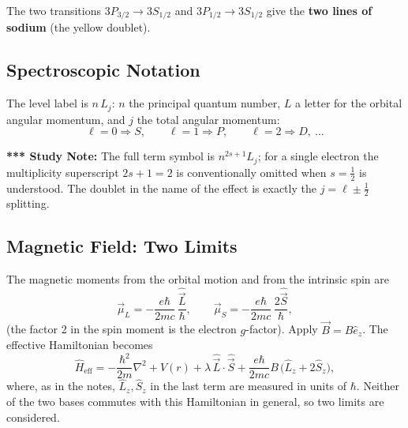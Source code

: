 \documentclass[11pt,a4paper]{article}
\begin{document}
\begin{center}
\end{center}
The two transitions $3P_{3/2}\to3S_{1/2}$ and $3P_{1/2}\to3S_{1/2}$ give the \textbf{two lines of sodium} (the yellow doublet).

\subsection{Spectroscopic Notation}
The level label is $n\,L_j$: $n$ the principal quantum number, $L$ a letter for the orbital angular momentum, and $j$ the total angular momentum:
\[
\ell=0\Rightarrow S,\qquad \ell=1\Rightarrow P,\qquad \ell=2\Rightarrow D,\ \dots
\]

\textbf{*** Study Note:} The full term symbol is $n^{2s+1}L_j$; for a single electron the multiplicity superscript $2s+1=2$ is conventionally omitted when $s=\tfrac12$ is understood. The doublet in the name of the effect is exactly the $j=\ell\pm\tfrac12$ splitting.

\subsection{Magnetic Field: Two Limits}
The magnetic moments from the orbital motion and from the intrinsic spin are
\[
\vec\mu_L=-\frac{e\hbar}{2mc}\,\frac{\hat{\vec L}}\hbar,\qquad \vec\mu_S=-\frac{e\hbar}{2mc}\,\frac{2\hat{\vec S}}\hbar ,
\]
(the factor 2 in the spin moment is the electron $g$-factor). Apply $\vec B=B\hat e_z$. The effective Hamiltonian becomes
\[
\hat H_{\mathrm{eff}}=-\frac{\hbar^2}{2m}\nabla^2+V(r)+\lambda\,\hat{\vec L}\cdot\hat{\vec S}+\frac{e\hbar}{2mc}B\,\big(\hat L_z+2\hat S_z\big),
\]
where, as in the notes, $\hat L_z,\hat S_z$ in the last term are measured in units of $\hbar$. Neither of the two bases commutes with this Hamiltonian in general, so two limits are considered.
\end{document}
